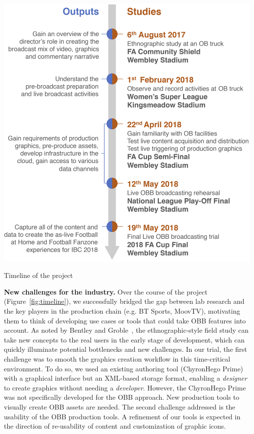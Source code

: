 \documentclass[sigchi-a, authorversion]{acmart}
\begin{document}
\begin{marginfigure}
    \vspace{-13pc}
    \hspace{-3pc}
    \includegraphics[width=\marginparwidth+3pc]{Figures/timeline.png}
    \caption{Timeline of the project}
    \label{fig:timeline}
\end{marginfigure}

\textbf{New challenges for the industry.} Over the course of the project (Figure~\ref{fig:timeline}), we successfully bridged the gap between lab research 
and the key players in the production chain (e.g. BT Sports, MoovTV),
motivating them to think of developing use cases or tools that
could take OBB features into account. As noted by Bentley and Groble~\cite{bentley2009},
the ethnographic-style field study can take new concepts to the real users in
the early stage of development, which can quickly illuminate potential
bottlenecks and new challenges. In our trial, the first challenge was to smooth the
graphics creation workflow in this time-critical environment. To
do so, we used an existing authoring tool (ChyronHego Prime) with a graphical
interface but an XML-based storage format, enabling a \textit{designer} to create
graphics without needing a \textit{developer}. However, the ChyronHego Prime was not specifically developed for the OBB approach. New production tools to visually create OBB assets are needed. The second challenge addressed is the usability of the OBB production tools. A refinement of our tools is expected in the direction of re-usability of content and customization of graphic icons. 
\end{document}

